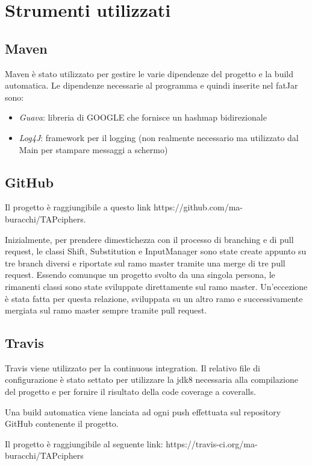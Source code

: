 \chapter{Strumenti utilizzati}

	\section{Maven}
		Maven è stato utilizzato per gestire le varie dipendenze del progetto e la build automatica.
		Le dipendenze necessarie al programma e quindi inserite nel fatJar sono: 
		\begin{itemize}
			\item \emph{Guava}: libreria di GOOGLE che fornisce un hashmap bidirezionale
			\item \emph{Log4J}: framework per il logging (non realmente necessario ma utilizzato dal Main per stampare messaggi a schermo)
		\end{itemize}
		
	\section{GitHub}
		Il progetto è raggiungibile a questo link https://github.com/ma-buracchi/TAPciphers. 
		
		Inizialmente, per prendere dimestichezza con il processo di branching e di pull request, le classi Shift, Substitution e InputManager sono state create appunto su tre branch diversi e riportate sul ramo master tramite una merge di tre pull request. Essendo comunque un progetto svolto da una singola persona, le rimanenti classi sono state sviluppate direttamente sul ramo master. Un'eccezione è stata fatta per questa relazione, sviluppata su un altro ramo e successivamente mergiata sul ramo master sempre tramite pull request.	
		
	\section{Travis}
		Travis viene utilizzato per la continuous integration. Il relativo file di configurazione è stato settato per utilizzare la jdk8 necessaria alla compilazione del progetto e per fornire il risultato della code coverage a coveralls.
		
		Una build automatica viene lanciata ad ogni push effettuata sul repository GitHub contenente il progetto.
		
		Il progetto è raggiungibile al seguente link: https://travis-ci.org/ma-buracchi/TAPciphers
		
